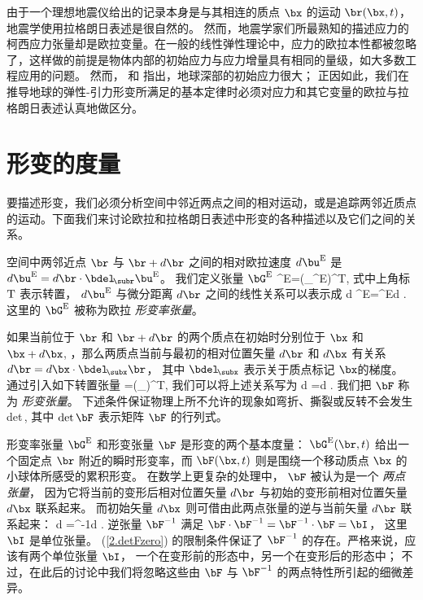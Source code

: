 由于一个理想地震仪给出的记录本身是与其相连的质点 $\bx$ 
的运动 $\br(\bx,t)$，地震学使用拉格朗日表述是很自然的。
然而，地震学家们所最熟知的描述应力的柯西应力张量却是欧拉变量。在一般的线性弹性理论中，应力的欧拉本性都被忽略了，这样做的前提是物体内部的初始应力与应力增量具有相同的量级，如大多数工程应用的问题。
然而， \textcite{rayleigh06} 和
\textcite{love11}指出，地球深部的初始应力很大； 正因如此，我们在推导地球的弹性-引力形变所满足的基本定律时必须对应力和其它变量的欧拉与拉格朗日表述认真地做区分。
%
%

\section{形变的度量}
%

要描述形变，我们必须分析空间中邻近两点之间的相对运动，或是追踪两邻近质点的运动。下面我们来讨论欧拉和拉格朗日表述中形变的各种描述以及它们之间的关系。

空间中两邻近点 $\br$ 与 $\br+d\/ \br$ 之间的相对欧拉速度 
$d\/ \bu^{\rm E}$ 是 
$d\/ \bu^{\rm E}=d\/ \br\cdot\bdel_{\!\subr}\bu^{\rm E}$。
我们定义张量 $\bG^{\rm E}$ 
\eq
\bG^{\rm E}=(\bdel_{\!\subr}\bu^{\rm E})^{\rm T},
\en
式中上角标 $\rm T$ 表示转置， $d\/\bu^{\rm E}$
与微分距离 $d\/\br$ 之间的线性关系可以表示成
\eq
d\/ \bu^{\rm E}=\bG^{\rm E}\cdot d\/ \br.
\en
这里的 $\bG^{\rm E}$ 被称为欧拉
{\em 形变率张量\/}。
%
%

如果当前位于 $\br$ 和 $\br+d\/ \br$
的两个质点在初始时分别位于 $\bx$ 和 $\bx+d\/ \bx$,
，那么两质点当前与最初的相对位置矢量
$d\/ \br$ 和 $d\/ \bx$ 有关系
$d\/ \br=d\/ \bx\cdot\bdel_{\!\subx}\br$，
其中 $\bdel_{\!\subx}$ 表示关于质点标记 $\bx$的梯度。
%
%
通过引入如下转置张量 
\eq
\label{2.Fdef}
\bF=(\bdel_{\!\subx}\br)^{\rm T},
\en
我们可以将上述关系写为
\eq
\label{2.drFdx}
d\/ \br=\bF\cdot d\/ \bx.
\en
我们把 $\bF$ 称为 {\em 形变张量}。
%
%
下述条件保证物理上所不允许的现象如弯折、撕裂或反转不会发生
\eq \label{2.detFzero}
{\rm det}\,\bF{},
\en
其中 ${\rm det}\,\bF$ 表示矩阵 $\bF$ 的行列式。

形变率张量 $\bG^{\rm E}$ 和形变张量
$\bF$ 是形变的两个基本度量：
$\bG^{\rm E}(\br,t)$ 给出一个固定点 $\br$ 附近的瞬时形变率，而 $\bF(\bx,t)$ 则是围绕一个移动质点 $\bx$ 的小球体所感受的累积形变。
在数学上更复杂的处理中，
$\bF$ 被认为是一个 {\em 两点张量}，
%
%
因为它将当前的变形后相对位置矢量 $d\/ \br$
与初始的变形前相对位置矢量 $d\/ \bx$ 联系起来。
而初始矢量 $d\/ \bx$ 则可借由此两点张量的逆与当前矢量 $d\/ \br$ 联系起来：
\eq
\label{2.Finvrel}
d\/ \bx=\bF^{-1}\cdot d\/ \br.
\en
逆张量 $\bF^{-1}$ 满足 $\bF\cdot\bF^{-1}=\bF^{-1}\cdot\bF=\bI$，
这里 $\bI$ 是单位张量。 (\ref{2.detFzero}) 的限制条件保证了 $\bF^{-1}$ 的存在。严格来说，应该有两个单位张量 $\bI$，
一个在变形前的形态中，另一个在变形后的形态中；
不过，在此后的讨论中我们将忽略这些由 $\bF$ 与 $\bF^{-1}$ 的两点特性所引起的细微差异。

